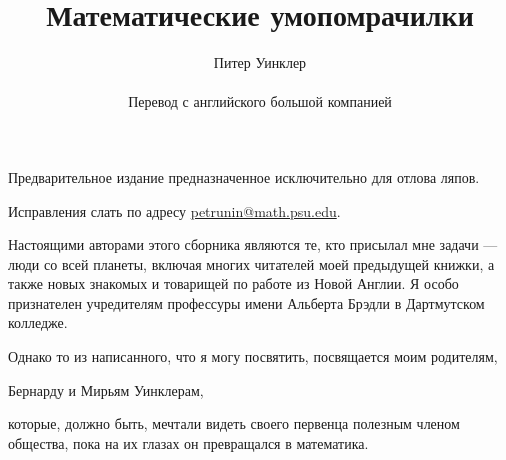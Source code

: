 \documentclass[twoside]{book}
\def\thetitle{Математические умопомрачилки} %
\def\theauthor{Питер Уинклер}
\begin{document}

\title{\thetitle}
\author{\theauthor\\
\\
Перевод с английского большой компанией}
\date{}
\maketitle

\thispagestyle{empty}

Предварительное издание предназначенное исключительно для отлова ляпов. 

Исправления слать по адресу 
\url{petrunin@math.psu.edu}.

\vfill

\pagebreak

Настоящими авторами этого сборника являются те, кто присылал мне задачи --- люди со всей планеты, включая многих читателей моей предыдущей книжки, а также новых знакомых и товарищей по работе из Новой Англии.
Я особо признателен учредителям профессуры имени Альберта Брэдли в Дартмутском колледже.

Однако то из написанного, что я могу посвятить, посвящается моим родителям,
\begin{center}
Бернарду и Мирьям Уинклерам,
\end{center}
которые, должно быть, мечтали видеть своего первенца полезным членом общества, пока на их глазах он превращался в математика.

\thispagestyle{empty}






















\appendix


{
\small

\printindex

}

{

\sloppy

\printbibliography[heading=bibintoc]


\fussy

}


\newpage

{

\tableofcontents

}
\end{document}
